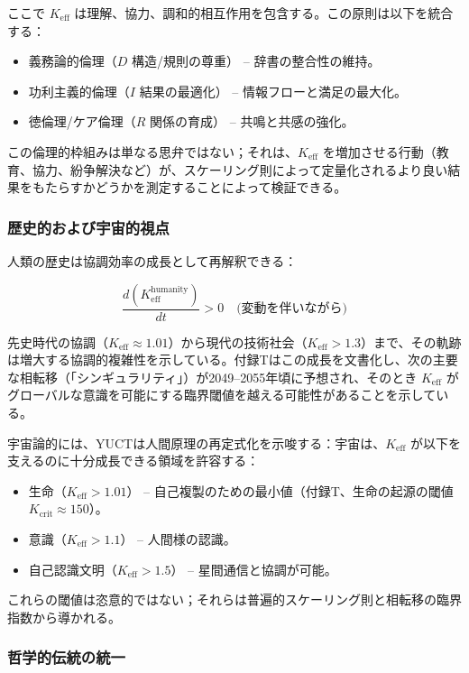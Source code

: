 \documentclass[12pt,a4paper]{article}
\newcommand{\eff}{\mathrm{eff}}
\newcommand{\Ke}{K_{\eff}}
\newcommand{\Kcrit}{K_{\mathrm{crit}}}
\begin{document}
	ここで \(\Ke\) は理解、協力、調和的相互作用を包含する。この原則は以下を統合する：
	\begin{itemize}
		\item 義務論的倫理（$D$ 構造/規則の尊重） – 辞書の整合性の維持。
		\item 功利主義的倫理（$I$ 結果の最適化） – 情報フローと満足の最大化。
		\item 徳倫理/ケア倫理（$R$ 関係の育成） – 共鳴と共感の強化。
	\end{itemize}
	
	この倫理的枠組みは単なる思弁ではない；それは、\(\Ke\) を増加させる行動（教育、協力、紛争解決など）が、スケーリング則によって定量化されるより良い結果をもたらすかどうかを測定することによって検証できる。
	
	\subsubsection{歴史的および宇宙的視点}
	
	人類の歴史は協調効率の成長として再解釈できる：
	
	\[
	\frac{d(\Ke^{\text{humanity}})}{dt} > 0 \quad \text{(変動を伴いながら)}
	\]
	
	先史時代の協調（\(\Ke \approx 1.01\)）から現代の技術社会（\(\Ke > 1.3\)）まで、その軌跡は増大する協調的複雑性を示している。付録Tはこの成長を文書化し、次の主要な相転移（「シンギュラリティ」）が2049--2055年頃に予想され、そのとき \(\Ke\) がグローバルな意識を可能にする臨界閾値を越える可能性があることを示している。
	
	宇宙論的には、YUCTは人間原理の再定式化を示唆する：宇宙は、\(\Ke\) が以下を支えるのに十分成長できる領域を許容する：
	\begin{itemize}
		\item 生命（\(\Ke > 1.01\)） – 自己複製のための最小値（付録T、生命の起源の閾値 \(\Kcrit \approx 150\)）。
		\item 意識（\(\Ke > 1.1\)） – 人間様の認識。
		\item 自己認識文明（\(\Ke > 1.5\)） – 星間通信と協調が可能。
	\end{itemize}
	
	これらの閾値は恣意的ではない；それらは普遍的スケーリング則と相転移の臨界指数から導かれる。
	
	\subsubsection{哲学的伝統の統一}
	
\end{document}
